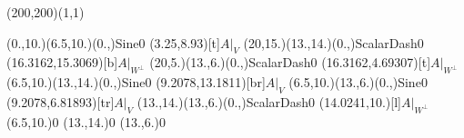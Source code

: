 \unitlength=1bp%

\begin{feynartspicture}(200,200)(1,1)

\FADiagram{}
\FAProp(0.,10.)(6.5,10.)(0.,){Sine}{0}
\FALabel(3.25,8.93)[t]{$A|_V$}
\FAProp(20,15.)(13.,14.)(0.,){ScalarDash}{0}
\FALabel(16.3162,15.3069)[b]{$A|_{W^\perp}$}
\FAProp(20,5.)(13.,6.)(0.,){ScalarDash}{0}
\FALabel(16.3162,4.69307)[t]{$A|_{W^\perp}$}
\FAProp(6.5,10.)(13.,14.)(0.,){Sine}{0}
\FALabel(9.2078,13.1811)[br]{$A|_V$}
\FAProp(6.5,10.)(13.,6.)(0.,){Sine}{0}
\FALabel(9.2078,6.81893)[tr]{$A|_V$}
\FAProp(13.,14.)(13.,6.)(0.,){ScalarDash}{0}
\FALabel(14.0241,10.)[l]{$A|_{W^\perp}$}
\FAVert(6.5,10.){0}
\FAVert(13.,14.){0}
\FAVert(13.,6.){0}
\end{feynartspicture}

